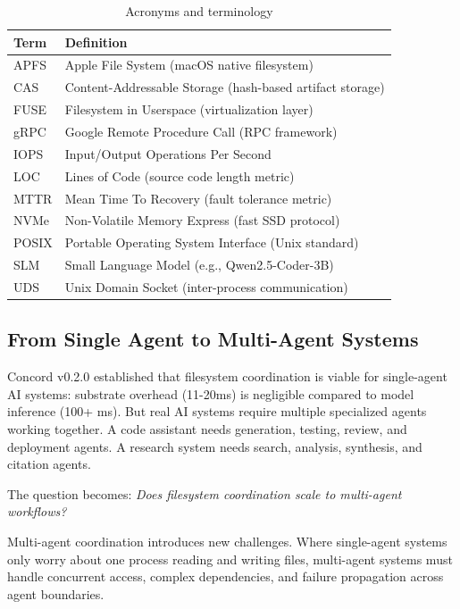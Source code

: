 \documentclass[11pt]{article}
\begin{document}
\begin{table}[h]
\centering
\begin{tabular}{lp{10cm}}
\toprule
\textbf{Term} & \textbf{Definition} \\
\midrule
APFS & Apple File System (macOS native filesystem) \\
CAS & Content-Addressable Storage (hash-based artifact storage) \\
FUSE & Filesystem in Userspace (virtualization layer) \\
gRPC & Google Remote Procedure Call (RPC framework) \\
IOPS & Input/Output Operations Per Second \\
LOC & Lines of Code (source code length metric) \\
MTTR & Mean Time To Recovery (fault tolerance metric) \\
NVMe & Non-Volatile Memory Express (fast SSD protocol) \\
POSIX & Portable Operating System Interface (Unix standard) \\
SLM & Small Language Model (e.g., Qwen2.5-Coder-3B) \\
UDS & Unix Domain Socket (inter-process communication) \\
\bottomrule
\end{tabular}
\caption{Acronyms and terminology}
\end{table}

\subsection{From Single Agent to Multi-Agent Systems}

Concord v0.2.0 established that filesystem coordination is viable for single-agent AI systems: substrate overhead (11-20ms) is negligible compared to model inference (100+ ms). But real AI systems require multiple specialized agents working together. A code assistant needs generation, testing, review, and deployment agents. A research system needs search, analysis, synthesis, and citation agents.

The question becomes: \textit{Does filesystem coordination scale to multi-agent workflows?}

Multi-agent coordination introduces new challenges. Where single-agent systems only worry about one process reading and writing files, multi-agent systems must handle concurrent access, complex dependencies, and failure propagation across agent boundaries.
\end{document}
